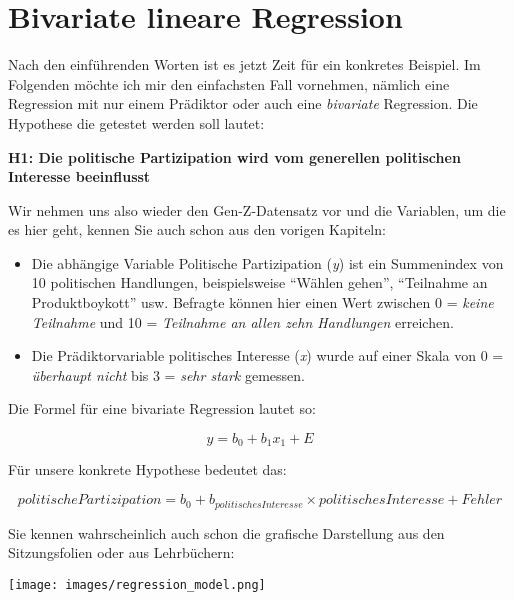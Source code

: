\documentclass[
]{book}
\begin{document}
\hypertarget{bivariate-lineare-regression}{%
\section{Bivariate lineare Regression}\label{bivariate-lineare-regression}}

Nach den einführenden Worten ist es jetzt Zeit für ein konkretes Beispiel. Im Folgenden möchte ich mir den einfachsten Fall vornehmen, nämlich eine Regression mit nur einem Prädiktor oder auch eine \emph{bivariate} Regression. Die Hypothese die getestet werden soll lautet:

\textbf{H1: Die politische Partizipation wird vom generellen politischen Interesse beeinflusst}

Wir nehmen uns also wieder den Gen-Z-Datensatz vor und die Variablen, um die es hier geht, kennen Sie auch schon aus den vorigen Kapiteln:

\begin{itemize}
\item
  Die abhängige Variable Politische Partizipation (\emph{y}) ist ein Summenindex von 10 politischen Handlungen, beispielsweise ``Wählen gehen'', ``Teilnahme an Produktboykott'' usw. Befragte können hier einen Wert zwischen 0 = \emph{keine Teilnahme} und 10 = \emph{Teilnahme an allen zehn Handlungen} erreichen.
\item
  Die Prädiktorvariable politisches Interesse (\emph{x}) wurde auf einer Skala von 0 = \emph{überhaupt nicht} bis 3 = \emph{sehr stark} gemessen.
\end{itemize}

Die Formel für eine bivariate Regression lautet so:

\[y = b_{0}+b_{1}x_{1}+E\]

Für unsere konkrete Hypothese bedeutet das:

\[politische Partizipation = b_{0}+b_{politisches Interesse} × politisches Interesse+Fehler\]

Sie kennen wahrscheinlich auch schon die grafische Darstellung aus den Sitzungsfolien oder aus Lehrbüchern:

\texttt{[image: images/regression\_model.png]}
\end{document}
